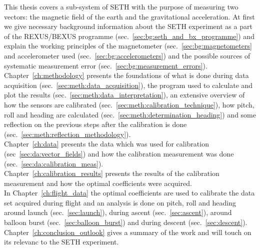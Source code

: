 This thesis covers a sub-system of \ac{SETH} with the purpose of measuring two vectors: the magnetic field of the earth and the gravitational acceleration. At first we give necessary background information about the \ac{SETH} experiment as a part of the \ac{REXUS/BEXUS} programme (sec.~\ref{sec:bg:seth_and_bx_programme}) and explain the working principles of the magnetometer (sec.~\ref{sec:bg:magnetometers} and accelerometer used (sec.~\ref{sec:bg:accelerometers}) and the possible sources of systematic measurement error (sec.~\ref{sec:bg:measurement_errors}).\\
Chapter~\ref{ch:methodology} presents the foundations of what is done during data acquisition (sec.~\ref{sec:meth:data_acquisition}), the program used to calculate and plot the results (sec.~\ref{sec:meth:data_interpretation}), an extensive overview of how the sensors are calibrated (sec.~\ref{sec:meth:calibration_technique}), how pitch, roll and heading are calculated (sec.~\ref{sec:meth:determination_heading}) and some reflection on the previous steps after the calibration is done (sec.~\ref{sec:meth:reflection_methodology}).\\
Chapter~\ref{ch:data} presents the data which was used for calibration (sec~\ref{sec:da:vector_fields}) and how the calibration measurement was done (sec.~\ref{sec:da:calibration_meas}).\\
Chapter~\ref{ch:calibration_results} presents the results of the calibration measurement and how the optimal coefficients were acquired.\\
In Chapter~\ref{ch:flight_data} the optimal coefficients are used to calibrate the data set acquired during flight and an analysis is done on pitch, roll and heading around launch (sec.~\ref{sec:launch}), during ascent (sec.~\ref{sec:ascent}), around balloon burst (sec.~\ref{sec:balloon_burst}) and during descent (sec.~\ref{sec:descent}).\\
Chapter~\ref{ch:conclusion_outlook} gives a summary of the work and will touch on its relevanc to the \ac{SETH} experiment.